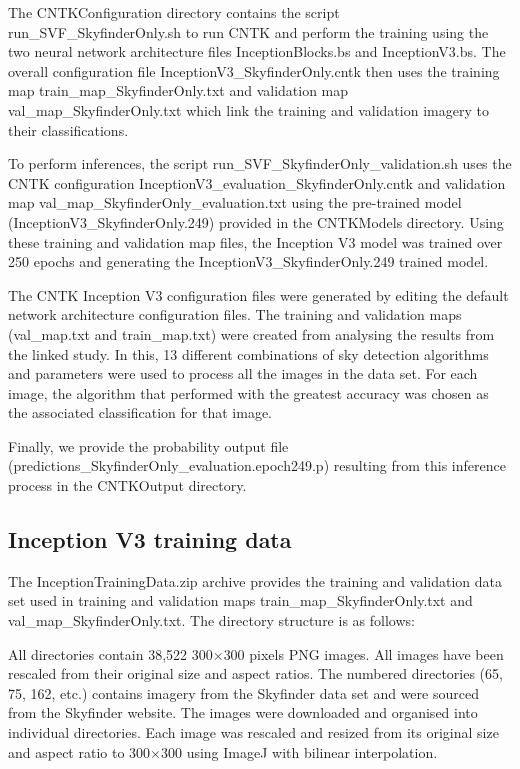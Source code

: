 \documentclass[final,3p,times,authoryear]{elsarticle}
\begin{document}

The CNTKConfiguration directory contains the script run\_SVF\_SkyfinderOnly.sh to run CNTK and perform the training using the two neural network architecture files InceptionBlocks.bs and InceptionV3.bs. The overall configuration file InceptionV3\_SkyfinderOnly.cntk then uses the training map train\_map\_SkyfinderOnly.txt and validation map val\_map\_SkyfinderOnly.txt which link the training and validation imagery to their classifications.

To perform inferences, the script run\_SVF\_SkyfinderOnly\_validation.sh uses the CNTK configuration InceptionV3\_evaluation\_SkyfinderOnly.cntk and validation map val\_map\_SkyfinderOnly\_evaluation.txt using the pre-trained model (InceptionV3\_SkyfinderOnly.249) provided in the CNTKModels directory. Using these training and validation map files, the Inception V3 model was trained over 250 epochs and generating the InceptionV3\_SkyfinderOnly.249 trained model. 

The CNTK Inception V3 configuration files were generated by editing the default network architecture configuration files. The training and validation maps (val\_map.txt and train\_map.txt) were created from analysing the results from the linked study. In this, 13 different combinations of sky detection algorithms and parameters were used to process all the images in the data set. For each image, the algorithm that performed with the greatest accuracy was chosen as the associated classification for that image. 

Finally, we provide the probability output file (predictions\_SkyfinderOnly\_evaluation.epoch249.p) resulting from this inference process in the CNTKOutput directory.

\subsection{Inception V3 training data}\label{sec:trainingData}
The InceptionTrainingData.zip archive provides the training and validation data set used in training and validation maps  train\_map\_SkyfinderOnly.txt and val\_map\_SkyfinderOnly.txt. The directory structure is as follows:


All directories contain 38,522 300$\times$300 pixels PNG images. All images have been rescaled from their original size and aspect ratios. The numbered directories (65, 75, 162, etc.) contains imagery from the Skyfinder data set and were sourced from the Skyfinder website. The images were downloaded and organised into individual directories. Each image was rescaled and resized from its original size and aspect ratio to 300$\times$300 using ImageJ \citep{Rueden2017} with bilinear interpolation.
\end{document}
